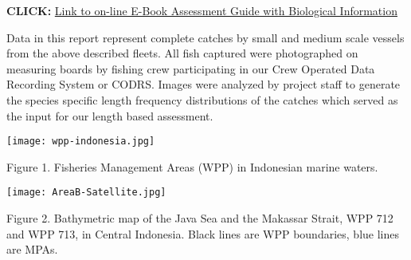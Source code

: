\textbf{CLICK: }\href{http://goo.gl/HLNC4q}{Link to on-line E-Book Assessment Guide with Biological Information}

Data in this report represent complete catches by small and medium scale vessels from the above described fleets. All fish captured were photographed on measuring boards by fishing crew participating in our Crew Operated Data Recording System or CODRS. Images were analyzed by project staff to generate the species specific length frequency distributions of the catches which served as the input for our length based assessment.

\begin{center}
\graphicspath{{/root/R-project/IFishSnapperWPP712_713/Images/}}
\texttt{[image: wpp-indonesia.jpg]}

Figure 1. Fisheries Management Areas (WPP) in Indonesian marine waters.
\end{center}

\begin{center}
\graphicspath{{/root/R-project/IFishSnapperWPP712_713/Images/}}
\texttt{[image: AreaB-Satellite.jpg]}

Figure 2. Bathymetric map of the Java Sea and the Makassar Strait, WPP 712 and WPP 713, in Central Indonesia. Black lines are WPP boundaries, blue lines are MPAs.
\end{center}